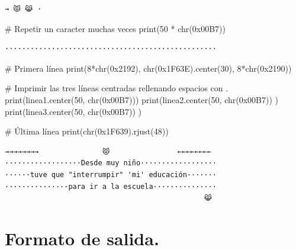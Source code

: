 \documentclass[
  spanish,
  letterpaper,
]{scrbook}
\newenvironment{Shaded}{\begin{snugshade}}{\end{snugshade}}
\newcommand{\BaseNTok}[1]{\textcolor[rgb]{0.68,0.00,0.00}{#1}}
\newcommand{\BuiltInTok}[1]{\textcolor[rgb]{0.00,0.23,0.31}{#1}}
\newcommand{\CommentTok}[1]{\textcolor[rgb]{0.37,0.37,0.37}{#1}}
\newcommand{\DecValTok}[1]{\textcolor[rgb]{0.68,0.00,0.00}{#1}}
\newcommand{\NormalTok}[1]{\textcolor[rgb]{0.00,0.23,0.31}{#1}}
\newcommand{\OperatorTok}[1]{\textcolor[rgb]{0.37,0.37,0.37}{#1}}
\theoremstyle{definition}
\theoremstyle{remark}
\begin{document}
\begin{verbatim}
→ 😾 😹 ·
\end{verbatim}

\begin{Shaded}
\begin{Highlighting}[]
\CommentTok{\# Repetir un caracter muchas veces}
\BuiltInTok{print}\NormalTok{(}\DecValTok{50} \OperatorTok{*} \BuiltInTok{chr}\NormalTok{(}\BaseNTok{0x00B7}\NormalTok{))}
\end{Highlighting}
\end{Shaded}

\begin{verbatim}
··················································
\end{verbatim}

\begin{Shaded}
\begin{Highlighting}[]
\CommentTok{\# Primera línea}
\BuiltInTok{print}\NormalTok{(}\DecValTok{8}\OperatorTok{*}\BuiltInTok{chr}\NormalTok{(}\BaseNTok{0x2192}\NormalTok{), }\BuiltInTok{chr}\NormalTok{(}\BaseNTok{0x1F63E}\NormalTok{).center(}\DecValTok{30}\NormalTok{), }\DecValTok{8}\OperatorTok{*}\BuiltInTok{chr}\NormalTok{(}\BaseNTok{0x2190}\NormalTok{))}

\CommentTok{\# Imprimir las tres líneas centradas rellenando espacios con .}
\BuiltInTok{print}\NormalTok{(linea1.center(}\DecValTok{50}\NormalTok{, }\BuiltInTok{chr}\NormalTok{(}\BaseNTok{0x00B7}\NormalTok{)))}
\BuiltInTok{print}\NormalTok{(linea2.center(}\DecValTok{50}\NormalTok{, }\BuiltInTok{chr}\NormalTok{(}\BaseNTok{0x00B7}\NormalTok{)) )}
\BuiltInTok{print}\NormalTok{(linea3.center(}\DecValTok{50}\NormalTok{, }\BuiltInTok{chr}\NormalTok{(}\BaseNTok{0x00B7}\NormalTok{)) )}

\CommentTok{\# Última línea}
\BuiltInTok{print}\NormalTok{(}\BuiltInTok{chr}\NormalTok{(}\BaseNTok{0x1F639}\NormalTok{).rjust(}\DecValTok{48}\NormalTok{))}
\end{Highlighting}
\end{Shaded}

\begin{verbatim}
→→→→→→→→               😾                ←←←←←←←←
··················Desde muy niño··················
······tuve que "interrumpir" 'mi' educación·······
···············para ir a la escuela···············
                                               😹
\end{verbatim}

\section{Formato de salida.}\label{formato-de-salida.}
\end{document}
